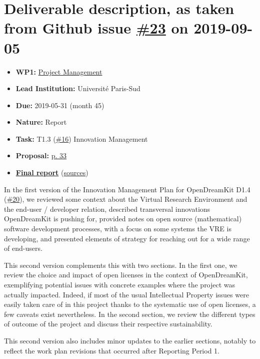 \hypertarget{deliverable-description-as-taken-from-github-issue-23-on-2019-09-05}{%
\section*{\texorpdfstring{Deliverable description, as taken from Github
issue
\href{https://github.com/OpenDreamKit/OpenDreamKit/issues/23}{\#23} on
2019-09-05}{Deliverable description, as taken from Github issue \#23 on 2019-09-05}}\label{deliverable-description-as-taken-from-github-issue-23-on-2019-09-05}}

\begin{itemize}
\tightlist
\item
  \textbf{WP1:}
  \href{https://github.com/OpenDreamKit/OpenDreamKit/tree/master/WP1}{Project
  Management}
\item
  \textbf{Lead Institution:} Université Paris-Sud
\item
  \textbf{Due:} 2019-05-31 (month 45)
\item
  \textbf{Nature:} Report
\item
  \textbf{Task:} T1.3
  (\href{https://github.com/OpenDreamKit/OpenDreamKit/issues/16}{\#16})
  Innovation Management
\item
  \textbf{Proposal:}
  \href{https://github.com/OpenDreamKit/OpenDreamKit/raw/master/Proposal/proposal-www.pdf}{p.
  33}
\item
  \textbf{\href{https://github.com/OpenDreamKit/OpenDreamKit/raw/master/WP1/D1.7/report-final.pdf}{Final
  report}}
  (\href{https://github.com/OpenDreamKit/OpenDreamKit/raw/master/WP1/D1.7/}{sources})
\end{itemize}

In the first version of the Innovation Management Plan for OpenDreamKit
D1.4
(\href{https://github.com/OpenDreamKit/OpenDreamKit/issues/20}{\#20}),
we reviewed some context about the Virtual Research Environment and the
end-user / developer relation, described transversal innovations
OpenDreamKit is pushing for, provided notes on open source
(mathematical) software development processes, with a focus on some
systems the VRE is developing, and presented elements of strategy for
reaching out for a wide range of end-users.

This second version complements this with two sections. In the first
one, we review the choice and impact of open licenses in the context of
OpenDreamKit, exemplifying potential issues with concrete examples where
the project was actually impacted. Indeed, if most of the usual
Intellectual Property issues were easily taken care of in this project
thanks to the systematic use of open licenses, a few caveats exist
nevertheless. In the second section, we review the different types of
outcome of the project and discuss their respective sustainability.

This second version also includes minor updates to the earlier sections,
notably to reflect the work plan revisions that occurred after Reporting
Period 1.
